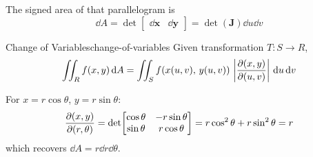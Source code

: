The signed area of that parallelogram is
\[
  \dd{A}
  = \det\!
  \begin{bmatrix}
    \dd{\mathbf{x}} & \dd{\mathbf{y}}
  \end{bmatrix}
  = \det(\mathbf{J})\dd{u}\dd{v}
\]

\begin{theorem}{Change of Variables}{change-of-variables}
  Given transformation $T\colon S\to R$,
  \[
    \iint_R f(x,y)\,\mathrm{d}A
    = \iint_S f(x(u,v),\,y(u,v))\,\left\lvert \frac{\partial (x,y)}{\partial (u,v)} \right\rvert\,\mathrm{d}u\,\mathrm{d}v
  \]
\end{theorem}

\begin{example}[Polar]
  For $x = r\cos\theta$, $y = r\sin\theta$:
  \[
    \frac{\partial (x,y)}{\partial (r,\theta)}
    = \det\!
    \begin{bmatrix}
      \cos\theta & -r\sin\theta \\
      \sin\theta & r\cos\theta
    \end{bmatrix}
    = r\cos^2\theta + r\sin^2\theta = r
  \]
  which recovers $\dd{A} = r\dd{r}\dd{\theta}$.
\end{example}
